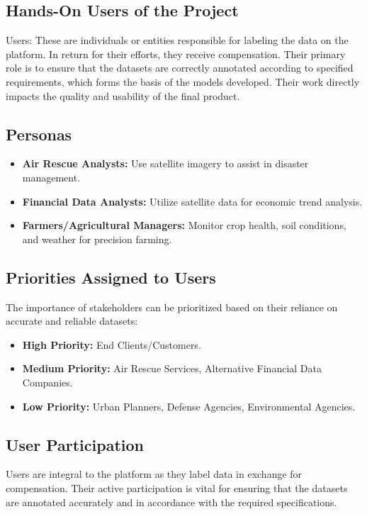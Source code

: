\documentclass[12pt]{article}
\begin{document}
\subsection{Hands-On Users of the Project}
Users: These are individuals or entities responsible for labeling the data on the platform. In return for their efforts, they receive compensation. Their primary role is to ensure that the datasets are correctly annotated according to specified requirements, which forms the basis of the models developed. Their work directly impacts the quality and usability of the final product.

\subsection{Personas}
\begin{itemize}
    \item \textbf{Air Rescue Analysts:} Use satellite imagery to assist in disaster management.
    \item \textbf{Financial Data Analysts:} Utilize satellite data for economic trend analysis.
    \item \textbf{Farmers/Agricultural Managers:} Monitor crop health, soil conditions, and weather for precision farming.
\end{itemize}

\subsection{Priorities Assigned to Users}
The importance of stakeholders can be prioritized based on their reliance on accurate and reliable datasets:
\begin{itemize}
    \item \textbf{High Priority:} End Clients/Customers.
    \item \textbf{Medium Priority:} Air Rescue Services, Alternative Financial Data Companies.
    \item \textbf{Low Priority:} Urban Planners, Defense Agencies, Environmental Agencies.
\end{itemize}

\subsection{User Participation}
Users are integral to the platform as they label data in exchange for compensation. Their active participation is vital for ensuring that the datasets are annotated accurately and in accordance with the required specifications.
\end{document}
